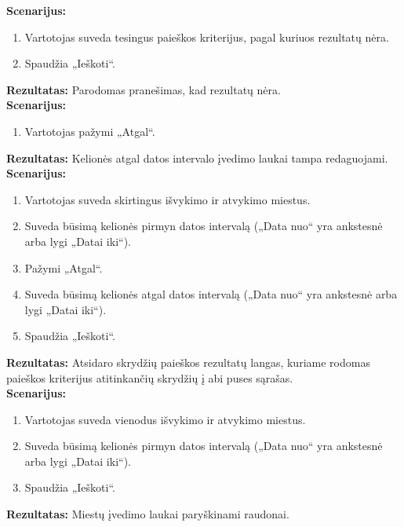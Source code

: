 \documentclass{VUMIFPSkursinis}
\begin{document}
            \noindent\textbf{Scenarijus:}
                \begin{enumerate}
                    \item Vartotojas suveda tesingus paieškos kriterijus, pagal kuriuos rezultatų nėra.
                    \item Spaudžia „Ieškoti“.
                \end{enumerate}
            \textbf{Rezultatas:} Parodomas pranešimas, kad rezultatų nėra.\\
            
            \noindent\textbf{Scenarijus:}
                \begin{enumerate}
                    \item Vartotojas pažymi „Atgal“.
                \end{enumerate}
            \textbf{Rezultatas:} Kelionės atgal datos intervalo įvedimo laukai tampa redaguojami.\\
            
            \noindent\textbf{Scenarijus:}
                \begin{enumerate}
                    \item Vartotojas suveda skirtingus išvykimo ir atvykimo miestus.
                    \item Suveda būsimą kelionės pirmyn datos intervalą („Data nuo“ yra ankstesnė arba lygi „Datai iki“).
                    \item Pažymi „Atgal“.
                    \item Suveda būsimą kelionės atgal datos intervalą („Data nuo“ yra ankstesnė arba lygi „Datai iki“).
                    \item Spaudžia „Ieškoti“.
                \end{enumerate}
            \textbf{Rezultatas:} Atsidaro skrydžių paieškos rezultatų langas, kuriame rodomas paieškos kriterijus atitinkančių skrydžių į abi puses sąrašas.\\
            
            \noindent\textbf{Scenarijus:}
                \begin{enumerate}
                    \item Vartotojas suveda vienodus išvykimo ir atvykimo miestus.
                    \item Suveda būsimą kelionės pirmyn datos intervalą („Data nuo“ yra ankstesnė arba lygi „Datai iki“).
                    \item Spaudžia „Ieškoti“.
                \end{enumerate}
            \textbf{Rezultatas:} Miestų įvedimo laukai paryškinami raudonai.\\
            
\end{document}
